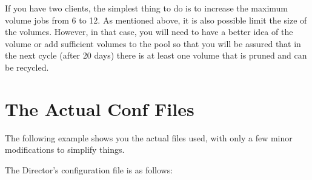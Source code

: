 If you have two clients, the simplest thing to do is to increase the
maximum volume jobs from 6 to 12. As mentioned above, it is also possible
limit the size of the volumes.  However, in that case, you will need to
have a better idea of the volume or add sufficient volumes to the pool so
that you will be assured that in the next cycle (after 20 days) there is
at least one volume that is pruned and can be recycled.


\label{Example}
\section{The Actual Conf Files}

The following example shows you the actual files used, with only a few minor
modifications to simplify things. 

The Director's configuration file is as follows: 


